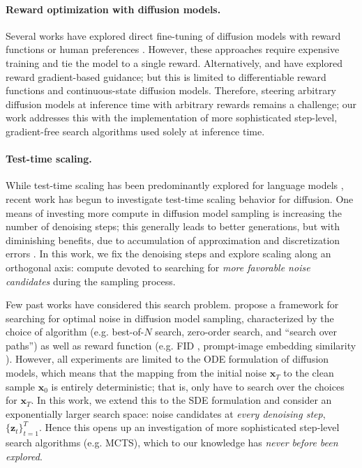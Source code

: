 \documentclass{article}
\newcommand{\x}{\mathbf{x}}
\begin{document}
\paragraph{Reward optimization with diffusion models.} Several works have explored direct fine-tuning of diffusion models with reward functions or human preferences \citep{black2024trainingdiffusionmodelsreinforcement, domingoenrich2025adjointmatchingfinetuningflow,wallace2023diffusionmodelalignmentusing,wang2025diffusionnpo}. However, these approaches require expensive training and tie the model to a
single reward. Alternatively, \citet{song2021scorebasedgenerativemodelingstochastic} and \citet{bansal2023universalguidancediffusionmodels} have explored reward gradient-based guidance; but this is limited to differentiable reward functions and continuous-state diffusion models. Therefore, steering arbitrary diffusion models at inference time with arbitrary rewards remains a challenge; our work addresses this with the implementation of more sophisticated step-level, gradient-free search algorithms used solely at inference time.

\paragraph{Test-time scaling.} While test-time scaling has been predominantly explored for language models \citep{yao2023treethoughtsdeliberateproblem, muennighoff2025s1simpletesttimescaling}, recent work has begun to investigate test-time scaling behavior for diffusion. One means of investing more compute in diffusion model sampling is increasing the number of denoising steps; this generally leads to better generations, but
with diminishing benefits, due to accumulation of approximation and discretization errors \citep{xu2023restartsamplingimprovinggenerative}.
In this work, we fix the denoising steps and explore scaling along an orthogonal axis: compute devoted to searching for \textit{more favorable noise candidates} during the sampling process.

Few past works have considered this search problem. \citet{ma2025inferencetimescalingdiffusionmodels} propose a framework for searching for optimal noise in diffusion model sampling, characterized by the choice of algorithm (e.g. best-of-$N$ search, zero-order search, and ``search over paths'') as well as reward function (e.g. FID \citep{heusel2018ganstrainedtimescaleupdate}, prompt-image embedding similarity \citep{radford2021learningtransferablevisualmodels, caron2021emergingpropertiesselfsupervisedvision}). However, all experiments are limited to the ODE formulation of diffusion models, which means that the mapping from the initial noise $\x_T$ to the clean sample $\x_0$ is entirely deterministic; that is, \citet{ma2025inferencetimescalingdiffusionmodels} only have to search over the choices for $\x_T$. In this work, we extend this to the SDE formulation and consider an exponentially larger search space: noise candidates at \textit{every denoising step}, $\{\mathbf{z}_t\}_{t=1}^T$. Hence this opens up an investigation of more sophisticated step‐level search algorithms (e.g. MCTS), which to our knowledge has \textit{never before been explored}.
\end{document}
